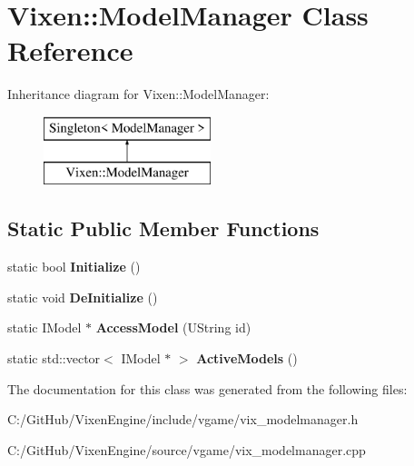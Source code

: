 \hypertarget{class_vixen_1_1_model_manager}{}\section{Vixen\+:\+:Model\+Manager Class Reference}
\label{class_vixen_1_1_model_manager}
Inheritance diagram for Vixen\+:\+:Model\+Manager\+:\begin{figure}[H]
\begin{center}
\leavevmode
\includegraphics[height=2.000000cm]{class_vixen_1_1_model_manager}
\end{center}
\end{figure}
\subsection*{Static Public Member Functions}
\begin{DoxyCompactItemize}
\item 
\hypertarget{class_vixen_1_1_model_manager_aa385a36198e6b8434ba86e0c98d74daf}{}static bool {\bfseries Initialize} ()\label{class_vixen_1_1_model_manager_aa385a36198e6b8434ba86e0c98d74daf}

\item 
\hypertarget{class_vixen_1_1_model_manager_a21fa43cc10cd22088b1131b044648586}{}static void {\bfseries De\+Initialize} ()\label{class_vixen_1_1_model_manager_a21fa43cc10cd22088b1131b044648586}

\item 
\hypertarget{class_vixen_1_1_model_manager_a5f5ef51f98b0e4f04c734d4734e115fa}{}static I\+Model $\ast$ {\bfseries Access\+Model} (U\+String id)\label{class_vixen_1_1_model_manager_a5f5ef51f98b0e4f04c734d4734e115fa}

\item 
\hypertarget{class_vixen_1_1_model_manager_a0f7e91af0bbbfbfe925e855bf7dcd5ed}{}static std\+::vector$<$ I\+Model $\ast$ $>$ {\bfseries Active\+Models} ()\label{class_vixen_1_1_model_manager_a0f7e91af0bbbfbfe925e855bf7dcd5ed}

\end{DoxyCompactItemize}


The documentation for this class was generated from the following files\+:\begin{DoxyCompactItemize}
\item 
C\+:/\+Git\+Hub/\+Vixen\+Engine/include/vgame/vix\+\_\+modelmanager.\+h\item 
C\+:/\+Git\+Hub/\+Vixen\+Engine/source/vgame/vix\+\_\+modelmanager.\+cpp\end{DoxyCompactItemize}
